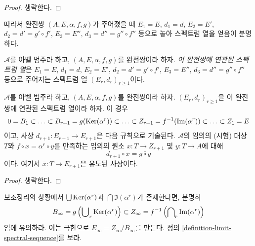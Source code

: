 \begin{proof}
생략한다.
\end{proof}

\noindent
따라서 완전쌍 $(A, E, \alpha, f, g)$가 주어졌을 때
$E_1 = E$, $d_1 = d$,
$E_2 = E'$, $d_2 = d' = g' \circ f'$, $E_3 = E''$,
$d_3 = d'' = g'' \circ f''$ 등으로 놓아 스펙트럼 열을 얻음이 분명하다.

\begin{definition}
\label{definition-spectral-sequence-associated-exact-couple}
$\mathcal{A}$를 아벨 범주라 하고, $(A, E, \alpha, f, g)$를 완전쌍이라
하자. {\it 이 완전쌍에 연관된 스펙트럼 열}은
$E_1 = E$, $d_1 = d$, $E_2 = E'$, $d_2 = d' = g' \circ f'$,
$E_3 = E''$, $d_3 = d'' = g'' \circ f''$ 등으로 주어지는
스펙트럼 열 $(E_r, d_r)_{r \geq 1}$이다.
\end{definition}

\begin{lemma}
\label{lemma-spectral-sequence-associated-exact-couple}
$\mathcal{A}$를 아벨 범주라 하고, $(A, E, \alpha, f, g)$를 완전쌍이라
하자. $(E_r, d_r)_{r \geq 1}$을 이 완전쌍에 연관된 스펙트럼 열이라
하자. 이 경우
$$
0 = B_1 \subset \ldots \subset
B_{r + 1} = g(\mathop{\mathrm{Ker}}(\alpha^r))
\subset \ldots \subset
Z_{r + 1} = f^{-1}(\mathop{\mathrm{Im}}(\alpha^r))
\subset \ldots \subset Z_1 = E
$$
이고, 사상 $d_{r + 1} : E_{r + 1} \to E_{r + 1}$은 다음 규칙으로
기술된다. $\mathcal{A}$의 임의의 (시험) 대상 $T$와
$f \circ x = \alpha^r \circ y$를 만족하는 임의의 원소
$x : T \to Z_{r + 1}$ 및 $y : T \to A$에 대해
$$
d_{r + 1} \circ \overline{x} = \overline{g \circ y}
$$
이다. 여기서 $\overline{x} : T \to E_{r + 1}$은 유도된 사상이다.
\end{lemma}

\begin{proof}
생략한다.
\end{proof}

\noindent
보조정리의 상황에서 $\bigcup \mathop{\mathrm{Ker}}(\alpha^r)$과
$\bigcap \Im(\alpha^r)$가 존재한다면, 분명히
$$
B_\infty = g\left(\bigcup\nolimits_r \mathop{\mathrm{Ker}}(\alpha^r)\right)
\subset
Z_\infty = f^{-1}\left(\bigcap\nolimits_r \mathop{\mathrm{Im}}(\alpha^r)\right)
$$
임에 유의하라. 이는 극한으로 $E_\infty = Z_\infty / B_\infty$를
만든다. 정의 \ref{definition-limit-spectral-sequence}를 보라.


